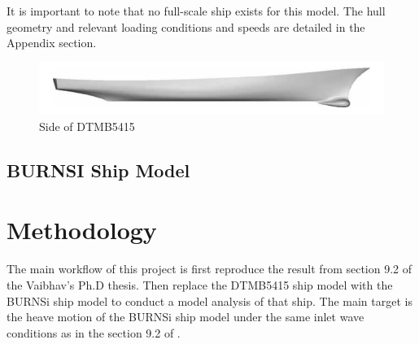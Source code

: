 \documentclass[12pt]{article} %
\begin{document}
It is important to note that no full-scale ship exists for this model. The hull geometry and relevant loading conditions and speeds are detailed in the Appendix section.
\begin{figure}[h]
    \centering
    \includegraphics[width=1\textwidth]{DTMB.png}
    \caption{Side of DTMB5415}
\end{figure}


\subsection{BURNSI Ship Model}

\section{Methodology}
The main workflow of this project is first reproduce the result from section 9.2 of the Vaibhav's Ph.D thesis\cite{joshi2018}. 
Then replace the DTMB5415 ship model with the BURNSi ship model to conduct a model analysis of that ship. The main target is the
heave motion of the BURNSi ship model under the same inlet wave conditions as in the section 9.2 of \cite{joshi2018}.
\end{document}
